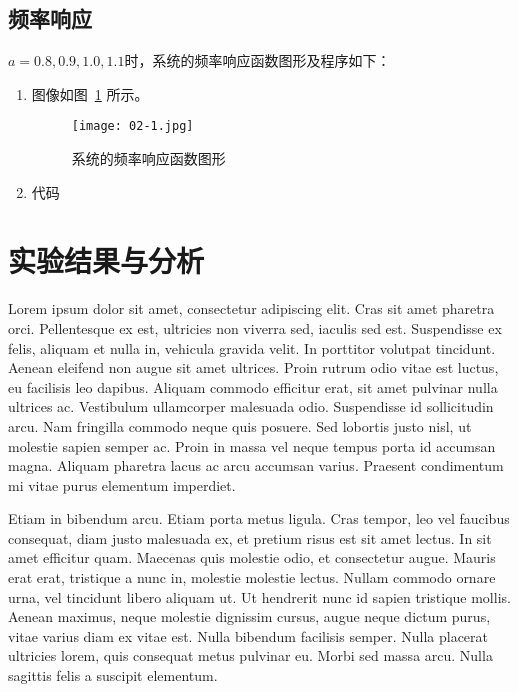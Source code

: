 \documentclass{xjtureport}
\begin{document}
\subsection{频率响应}
$a = 0.8, 0.9, 1.0, 1.1$时，系统的频率响应函数图形及程序如下：
\begin{enumerate}
    \item 图像如图~\ref{fig:resp} 所示。
          \begin{figure}[!htbp]
              \centering
              \texttt{[image: 02-1.jpg]}
              \caption{系统的频率响应函数图形}
              \label{fig:resp}
          \end{figure}
    \item 代码
          
\end{enumerate}

\section{实验结果与分析}

Lorem ipsum dolor sit amet, consectetur adipiscing elit. Cras sit amet pharetra orci. Pellentesque ex est, ultricies non viverra sed, iaculis sed est. Suspendisse ex felis, aliquam et nulla in, vehicula gravida velit. In porttitor volutpat tincidunt. Aenean eleifend non augue sit amet ultrices. Proin rutrum odio vitae est luctus, eu facilisis leo dapibus. Aliquam commodo efficitur erat, sit amet pulvinar nulla ultrices ac. Vestibulum ullamcorper malesuada odio. Suspendisse id sollicitudin arcu. Nam fringilla commodo neque quis posuere. Sed lobortis justo nisl, ut molestie sapien semper ac. Proin in massa vel neque tempus porta id accumsan magna. Aliquam pharetra lacus ac arcu accumsan varius. Praesent condimentum mi vitae purus elementum imperdiet.

Etiam in bibendum arcu. Etiam porta metus ligula. Cras tempor, leo vel faucibus consequat, diam justo malesuada ex, et pretium risus est sit amet lectus. In sit amet efficitur quam. Maecenas quis molestie odio, et consectetur augue. Mauris erat erat, tristique a nunc in, molestie molestie lectus. Nullam commodo ornare urna, vel tincidunt libero aliquam ut. Ut hendrerit nunc id sapien tristique mollis. Aenean maximus, neque molestie dignissim cursus, augue neque dictum purus, vitae varius diam ex vitae est. Nulla bibendum facilisis semper. Nulla placerat ultricies lorem, quis consequat metus pulvinar eu. Morbi sed massa arcu. Nulla sagittis felis a suscipit elementum.
\end{document}
